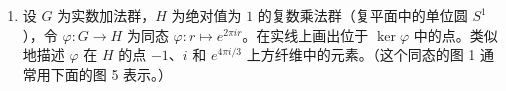 \begin{enumerate}[label=\arabic*.]
\begin{enumerate}[label=(\alph*)]
    \item 证明映射 $\begin{pmatrix}a&b\\0&c\end{pmatrix}\mapsto a$ 是从 $G$ 到 $F^\times$ 的满同态。描述其纤维与核。
    \item 证明映射 $\begin{pmatrix}a&b\\0&c\end{pmatrix}\mapsto (a,c)$ 是从 $G$ 到 $F^\times\times F^\times$ 的满同态。描述其纤维与核。
    \item 令 $H=\left\{\begin{pmatrix}1&b\\0&1\end{pmatrix}\mid b\in F\right\}$。证明 $H$ 同构于 $F$ 的加法群。
  \end{enumerate}
  \item 设 $G$ 为实数加法群，$H$ 为绝对值为 $1$ 的复数乘法群（复平面中的单位圆 $S^1$），令 $\varphi:G\to H$ 为同态 $\varphi:r\mapsto e^{2\pi ir}$。在实线上画出位于 $\ker\varphi$ 中的点。类似地描述 $\varphi$ 在 $H$ 的点 $-1$、$i$ 和 $e^{4\pi i/3}$ 上方纤维中的元素。（这个同态的图 1 通常用下面的图 5 表示。）


\end{enumerate}
